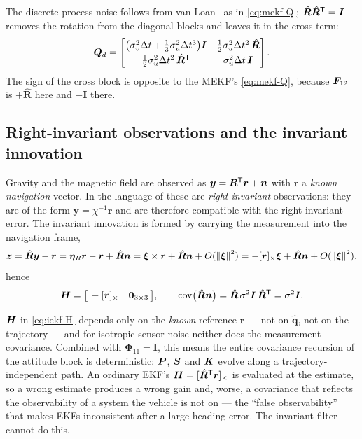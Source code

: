 The discrete process noise follows from van Loan~\cite{vanloan1978} as in \eqref{eq:mekf-Q};
$\hat{\bm{R}}\hat{\bm{R}}^{\mathsf{T}}=\bm{I}$ removes the rotation from the diagonal blocks and leaves it in
the cross term:
\begin{equation}
\bm{Q}_d=\begin{bmatrix}
 \big(\sigma_v^2\Delta t+\tfrac13\sigma_u^2\Delta t^3\big)\bm{I} & \tfrac12\sigma_u^2\Delta t^2\,\hat{\bm{R}}\\[2pt]
 \tfrac12\sigma_u^2\Delta t^2\,\hat{\bm{R}}^{\mathsf{T}} & \sigma_u^2\Delta t\,\bm{I}\end{bmatrix} .
\label{eq:iekf-Q}
\end{equation}
The sign of the cross block is opposite to the MEKF's \eqref{eq:mekf-Q}, because $\bm{F}_{12}$ is
$+\hat{\bm{R}}$ here and $-\bm{I}$ there.

\subsection{Right-invariant observations and the invariant innovation}
Gravity and the magnetic field are observed as $\bm{y}=\bm{R}^{\mathsf{T}}\bm{r}+\bm{n}$ with $\bm{r}$ a
\emph{known navigation} vector. In the language of \cite{barrau2017iekf} these are
\emph{right-invariant} observations: they are of the form $\bm{y}=\chi^{-1}\bm{r}$ and are therefore
compatible with the right-invariant error. The invariant innovation is formed by carrying the
measurement into the navigation frame,
\begin{equation}
\bm{z} = \hat{\bm{R}}\bm{y} - \bm{r}
 = \bm{\eta}_R\bm{r} - \bm{r} + \hat{\bm{R}}\bm{n}
 = \bm{\xi}\times\bm{r} + \hat{\bm{R}}\bm{n} + O(\left\lVert \bm{\xi} \right\rVert^2)
 = -[\bm{r}]_\times\bm{\xi} + \hat{\bm{R}}\bm{n} + O(\left\lVert \bm{\xi} \right\rVert^2),
\label{eq:iekf-z}
\end{equation}
hence
\begin{equation}
\bm{H} = \big[\,-[\bm{r}]_\times\quad \bm{0}_{3\times3}\,\big],
\qquad
\operatorname{cov}\!\big(\hat{\bm{R}}\bm{n}\big)=\hat{\bm{R}}\,\sigma^2\bm{I}\,\hat{\bm{R}}^{\mathsf{T}}=\sigma^2\bm{I} .
\label{eq:iekf-H}
\end{equation}
\begin{remark}
$\bm{H}$ in \eqref{eq:iekf-H} depends only on the \emph{known} reference $\bm{r}$ --- not on
$\hat{\bm{q}}$, not on the trajectory --- and for isotropic sensor noise neither does the
measurement covariance. Combined with $\bm{\Phi}_{11}=\bm{I}$, this means the entire covariance
recursion of the attitude block is deterministic: $\bm{P}$, $\bm{S}$ and $\bm{K}$ evolve along a
trajectory-independent path. An ordinary EKF's $\bm{H}=[\hat{\bm{R}}^{\mathsf{T}}\bm{r}]_\times$ is evaluated at
the estimate, so a wrong estimate produces a wrong gain and, worse, a covariance that reflects the
observability of a system the vehicle is not on --- the ``false observability'' that makes EKFs
inconsistent after a large heading error. The invariant filter cannot do this.
\end{remark}

